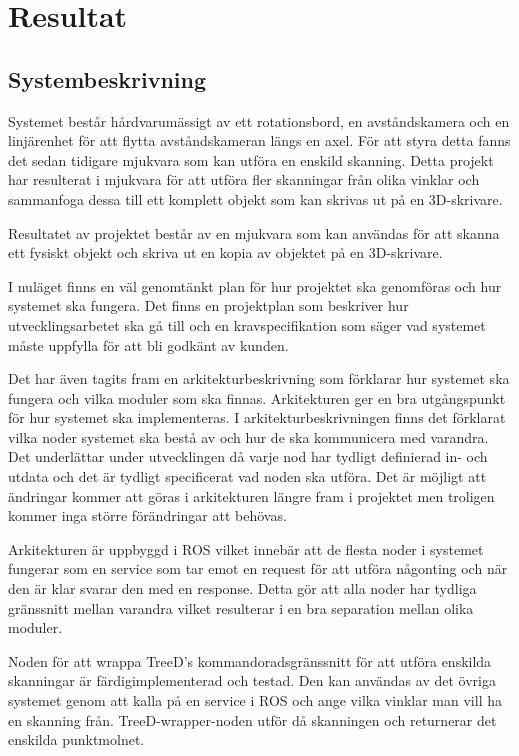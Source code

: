 \chapter{Resultat}
\label{cha:results}

\section{Systembeskrivning}

Systemet består hårdvarumässigt av ett rotationsbord, en avståndskamera och en linjärenhet för att flytta avståndskameran längs en axel. För att styra detta fanns det sedan tidigare mjukvara som kan utföra en enskild skanning. Detta projekt har resulterat i mjukvara för att utföra fler skanningar från olika vinklar och sammanfoga dessa till ett komplett objekt som kan skrivas ut på en 3D-skrivare.

Resultatet av projektet består av en mjukvara som kan användas för att skanna ett fysiskt objekt och skriva ut en kopia av objektet på en 3D-skrivare.

I nuläget finns en väl genomtänkt plan för hur projektet ska genomföras och hur systemet ska fungera. Det finns en projektplan som beskriver hur utvecklingsarbetet ska gå till och en kravspecifikation som säger vad systemet måste uppfylla för att bli godkänt av kunden.

Det har även tagits fram en arkitekturbeskrivning som förklarar hur systemet ska fungera och vilka moduler som ska finnas. Arkitekturen ger en bra utgångspunkt för hur systemet ska implementeras. I arkitekturbeskrivningen finns det förklarat vilka noder systemet ska bestå av och hur de ska kommunicera med varandra. Det underlättar under utvecklingen då varje nod har tydligt definierad in- och utdata och det är tydligt specificerat vad noden ska utföra. Det är möjligt att ändringar kommer att göras i arkitekturen längre fram i projektet men troligen kommer inga större förändringar att behövas.

Arkitekturen är uppbyggd i ROS vilket innebär att de flesta noder i systemet fungerar som en service som tar emot en request för att utföra någonting och när den är klar svarar den med en response. Detta gör att alla noder har tydliga gränssnitt mellan varandra vilket resulterar i en bra separation mellan olika moduler.

Noden för att wrappa TreeD's kommandoradsgränssnitt för att utföra enskilda skanningar är färdigimplementerad och testad. Den kan användas av det övriga systemet genom att kalla på en service i ROS och ange vilka vinklar man vill ha en skanning från. TreeD-wrapper-noden utför då skanningen och returnerar det enskilda punktmolnet.

